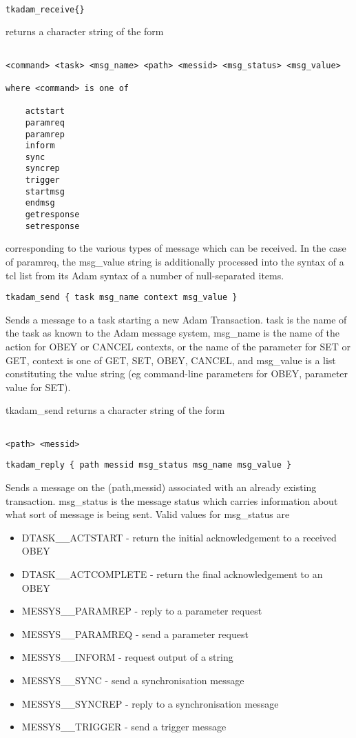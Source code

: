 \begin{verbatim}

tkadam_receive{}

\end{verbatim}
returns a character string of the form
\begin{verbatim}

<command> <task> <msg_name> <path> <messid> <msg_status> <msg_value>

where <command> is one of

	actstart
	paramreq
	paramrep
	inform
	sync
	syncrep
	trigger
	startmsg
	endmsg
	getresponse
	setresponse
\end{verbatim}

corresponding to the various types of message which can be received. In
the case of paramreq, the msg\_value string is additionally processed
into the syntax of a tcl list from its Adam syntax of a number of
null-separated items.

\begin{verbatim}
tkadam_send { task msg_name context msg_value }
\end{verbatim}

Sends a message to a task starting a new Adam Transaction.
task is the name of the task as known to the Adam message system,
msg\_name is the name of the action for OBEY or CANCEL contexts, or the
name of the parameter for SET or GET, context is one of GET, SET, OBEY,
CANCEL, and msg\_value is a list constituting the value string (eg
command-line parameters for OBEY, parameter value for SET).

tkadam\_send returns a character string of the form
\begin{verbatim}

<path> <messid>

\end{verbatim}

\begin{verbatim}
tkadam_reply { path messid msg_status msg_name msg_value }
\end{verbatim}

Sends a message on the (path,messid) associated with an already existing
transaction. msg\_status is the message status which carries information
about what sort of message is being sent. Valid values for msg\_status are

\begin{itemize}
\item DTASK\_\_ACTSTART - return the initial acknowledgement to a
received OBEY
\item DTASK\_\_ACTCOMPLETE - return the final acknowledgement to an OBEY
\item MESSYS\_\_PARAMREP - reply to a parameter request
\item MESSYS\_\_PARAMREQ - send a parameter request
\item MESSYS\_\_INFORM - request output of a string 
\item MESSYS\_\_SYNC - send a synchronisation message
\item MESSYS\_\_SYNCREP - reply to a synchronisation message
\item MESSYS\_\_TRIGGER - send a trigger message
\end{itemize}


